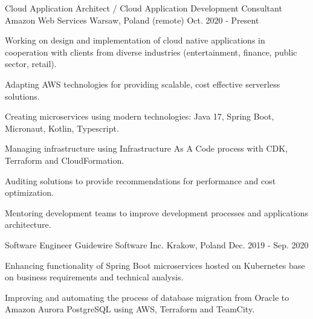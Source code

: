 

\begin{cventries}


  \cventry
    {Cloud Application Architect / Cloud Application Development Consultant} %
    {Amazon Web Services} %
    {Warsaw, Poland (remote)} %
    {Oct. 2020 - Present} %
    {
      \begin{cvitems} %
       \item {Working on design and implementation of cloud native applications in cooperation with clients from diverse industries (entertainment, finance, public sector, retail). }
       \item {Adapting AWS technologies for providing scalable, cost effective serverless solutions.}
       \item {Creating microservices using modern technologies: Java 17, Spring Boot, Micronaut, Kotlin, Typescript.}
       \item {Managing infrastructure using Infrastructure As A Code process with CDK, Terraform and CloudFormation.}
       \item {Auditing solutions to provide recommendations for performance and cost optimization.}
       \item {Mentoring development teams to improve development processes and applications architecture.}
      \end{cvitems}
    }

  \cventry
    {Software Engineer} %
    {Guidewire Software Inc.} %
    {Krakow, Poland} %
    {Dec. 2019 - Sep. 2020} %
    {
      \begin{cvitems} %
       \item {Enhancing functionality of Spring Boot microservices hosted on Kubernetes base on business requirements and technical analysis.}
        \item {Improving and automating the process of database migration from Oracle to Amazon Aurora PostgreSQL using AWS, Terraform and TeamCity.}
      \end{cvitems}
    }


\end{cventries}
